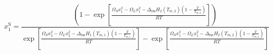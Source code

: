 \documentclass{article}
\begin{document}
\[
x_1^{\text{S}} =
\frac{
\left(1 - 
\exp\left[ 
\frac{\Omega_S x_1^2 - \Omega_L x_1^2 - \Delta_{\text{fus}} H_2 (T_{m,2}) \left( 1 - \frac{T}{T_{m,2}} \right)}{RT}
\right]
\right)
}
{
\exp\left[ 
\frac{\Omega_S x_2^2 - \Omega_L x_2^2 - \Delta_{\text{fus}} H_1 (T_{m,1}) \left( 1 - \frac{T}{T_{m,1}} \right)}{RT}
\right]
- 
\exp\left[ 
\frac{\Omega_S x_1^2 - \Omega_L x_1^2 - \Delta_{\text{fus}} H_2 (T_{m,2}) \left( 1 - \frac{T}{T_{m,2}} \right)}{RT}
\right]
}
\]
\end{document}
